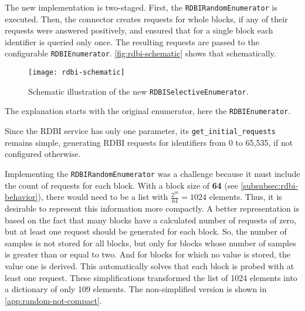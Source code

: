 The new implementation is two-staged. First, the \texttt{RDBIRandomEnumerator} is executed. Then, the connector creates requests for whole blocks, if any of their requests were answered positively, and ensured that for a single block each identifier is queried only once. The resulting requests are passed to the configurable \texttt{RDBIEnumerator}. \autoref{fig:rdbi-schematic} shows that schematically.

\begin{figure}[htb]
    \centering
    \texttt{[image: rdbi-schematic]}
    \caption{Schematic illustration of the new \texttt{RDBISelectiveEnumerator}.}
    \label{fig:rdbi-schematic}
\end{figure}

The explanation starts with the original enumerator, here the \texttt{RDBIEnumerator}.


Since the RDBI service has only one parameter, its \texttt{get_initial_requests} remains simple, generating RDBI requests for identifiers from 0 to 65,535, if not configured otherwise.

Implementing the \texttt{RDBIRandomEnumerator} was a challenge because it must include the count of requests for each block. With a block size of \textbf{64} (see \autoref{subsubsec:rdbi-behavior}), there would need to be a list with $\frac{2^{16}}{64} = 1024$ elements. Thus, it is desirable to represent this information more compactly. A better representation is based on the fact that many blocks have a calculated number of requests of zero, but at least one request should be generated for each block. So, the number of samples is not stored for all blocks, but only for blocks whose number of samples is greater than or equal to two. And for blocks for which no value is stored, the value one is derived. This automatically solves that each block is probed with at least one request. These simplifications transformed the list of 1024 elements into a dictionary of only 109 elements. The non-simplified version is shown in \autoref{app:random-not-compact}.

